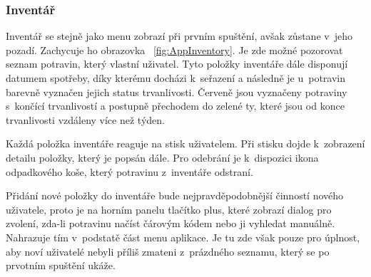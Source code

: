 \documentclass[thesis=B,czech]{FITthesis}[2013/10/20]
\begin{document}
\clearpage

\subsubsection{Inventář}

Inventář se stejně jako menu zobrazí při prvním spuštění, avšak zůstane v~jeho pozadí. Zachycuje ho obrazovka ~\ref{fig:AppInventory}. Je zde možné pozorovat seznam potravin, který vlastní uživatel. Tyto položky inventáře dále disponují datumem spotřeby, díky kterému docházi k~seřazení a následně je u~potravin barevně vyznačen jejich status trvanlivosti. Červeně jsou vyznačeny potraviny s~končící trvanlivostí a postupně přechodem do zelené ty, které jsou od konce trvanlivosti vzdáleny více než týden.

Každá položka inventáře reaguje na stisk uživatelem. Při stisku dojde k~zobrazení detailu položky, který je popsán dále. Pro odebrání je k~dispozici ikona odpadkového koše, který potravinu z~inventáře odstraní.

Přidání nové položky do inventáře bude nejpravděpodobnější činností nového uživatele, proto je na horním panelu tlačítko plus, které zobrazí dialog pro zvolení, zda-li potravinu načíst čárovým kódem nebo ji vyhledat manuálně. Nahrazuje tím v~podstatě část menu aplikace. Je tu zde však pouze pro úplnost, aby noví uživatelé nebyli příliš zmateni z~prázdného seznamu, který se po prvotním spuštění ukáže.
\end{document}
